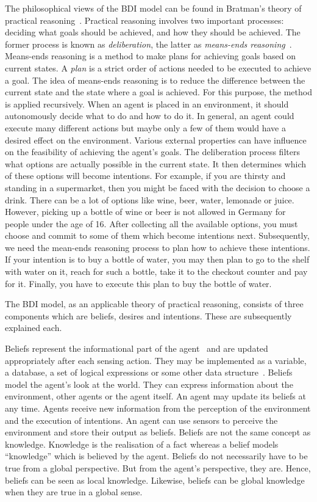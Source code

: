 The philosophical views of the BDI model can be found in Bratman's theory of practical reasoning~\cite{Sebastian_Hierarchical_2006}.
Practical reasoning involves two important processes: deciding what goals should be achieved, and how they should be achieved.
The former process is known as \emph{deliberation}, the latter as \emph{means-ends reasoning}~\cite{Gerhard_MultiSystem_1999}.
Means-ends reasoning is a method to make plans for achieving goals based on current states.
A \emph{plan} is a strict order of actions needed to be executed to achieve a goal.
The idea of means-ends reasoning is to reduce the difference between the current state and the state where a goal is achieved.
For this purpose, the method is applied recursively.
When an agent is placed in an environment, it should autonomously decide what to do and how to do it.
In general, an agent could execute many different actions but maybe only a few of them would have a desired effect on the environment.
Various external properties can have influence on the feasibility of achieving the agent's goals.
The deliberation process filters what options are actually possible in the current state.
It then determines which of these options will become intentions.
For example, if you are thirsty and standing in a supermarket, then you might be faced with the decision to choose a drink.
There can be a lot of options like wine, beer, water, lemonade or juice.
However, picking up a bottle of wine or beer is not allowed in Germany for people under the age of 16. %
After collecting all the available options, you must choose and commit to some of them which become intentions next.
Subsequently, we need the mean-ends reasoning process to plan how to achieve these intentions.
If your intention is to buy a bottle of water, you may then plan to go to the shelf with water on it, reach for such a bottle, take it to the checkout counter and pay for it.
Finally, you have to execute this plan to buy the bottle of water.

The BDI model, as an applicable theory of practical reasoning, consists of three components which are beliefs, desires and intentions.
These are subsequently explained each.

Beliefs represent the informational part of the agent~\cite{Rao_BDITheory_1995} and are updated appropriately after each sensing action.
They may be implemented as a variable, a database, a set of logical expressions or some other data structure~\cite{Rao_BDITheory_1995}.
Beliefs model the agent's look at the world.
They can express information about the environment, other agents or the agent itself.
An agent may update its beliefs at any time.
Agents receive new information from the perception of the environment and the execution of intentions.
An agent can use sensors to perceive the environment and store their output as beliefs.
Beliefs are not the same concept as knowledge.
Knowledge is the realisation of a fact whereas a belief models \enquote{knowledge} which is believed by the agent.
Beliefs do not necessarily have to be true from a global perspective.
But from the agent's perspective, they are.
Hence, beliefs can be seen as local knowledge.
Likewise, beliefs can be global knowledge when they are true in a global sense.

